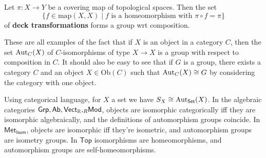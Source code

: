 \begin{example}
   Let $\pi \colon X \to Y$ be a covering map of topological spaces. Then the set \[
       \{f \in  \mathrm{map}(X,X) \mid  f \text{ is a homeomorphism with } \pi \circ f = \pi\} 
   \]  of \textbf{deck transformations} forms a group wrt composition.
\end{example}
These are all examples of the fact that if $X$ is an object in a category $C$, then the set $\mathrm{Aut}_C (X)$ of $C$-isomorphisms of type $X \to X$ is a group with respect to composition in $C$. It should also be easy to see that if $G$ is a group, there exists a category $C$ and an object $X \in \mathrm{Ob}(C)$ such that $\mathrm{Aut}_C(X) \cong G$ by considering the category with one object.
 \begin{example}
     Using categorical language, for $X$ a set we have $S_X \cong  \mathrm{Aut} _{\mathsf{Set} }(X)$. In the algebraic categories $\mathsf{Grp,Ab,Vect_{\mathbb{R}},}{}_R \mathsf{Mod}   $, objects are isomorphic categorically iff they are isomorphic algebraically, and the definitions of automorphism groups coincide. In $\mathsf{Met_{Isom}} $, objects are isomorphic iff they're isometric, and automorphism groups are isometry groups. In $\mathsf{Top} $ isomorphisms are homeomorphisms, and automorphism groups are self-homeomorphisms.
\end{example}
